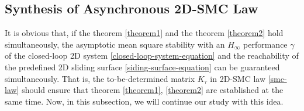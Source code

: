 \documentclass[journal,final,twocolumn]{IEEEtran}
\begin{document}
 
\subsection{  Synthesis of Asynchronous 2D-SMC Law }\label{smc-law-synthesis} 
It is obvious that, if the theorem \ref{theorem1} and the theorem \ref{theorem2} hold simultaneously, the asymptotic mean square stability  with an $H_{\infty}$  performance $\gamma$ of the closed-loop 2D system \eqref{closed-loop-system-equation} and the reachability of the predefined 2D sliding surface \eqref{siding-surface-equation} can be guaranteed simultaneously. That is, the to-be-determined matrix $K_{\tau }$ in 2D-SMC law \eqref{smc-law} should ensure that theorem \ref{theorem1}, \ref{theorem2} are established at the same time. Now, in this subsection, we will continue our study with this idea.
\end{document}

